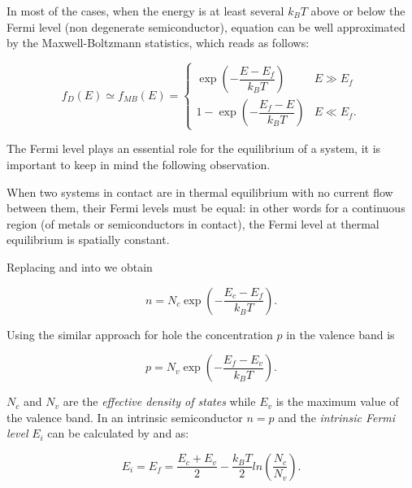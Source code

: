 In most of the cases, when the energy is at least several $k_BT$ above or below the Fermi level (non degenerate semiconductor), equation  can be well approximated by the Maxwell-Boltzmann statistics, which reads as follows:

\begin{equation}
\label{eq: maxwell distribution}
f_D(E)\simeq f_{MB}(E) = 
\begin{cases}
\exp\left(-\dfrac{E-E_f}{k_B T}\right) & E\gg E_f \\
1-\exp\left(-\dfrac{E_f-E}{k_BT}\right) & E \ll E_f .
\end{cases}
\end{equation}

The Fermi level plays an essential role for the equilibrium of a system, it is important to keep in mind the following observation.

\begin{Osservazione}
When two systems in contact are in thermal equilibrium with no current flow between them, their Fermi levels must be equal: in other words for a continuous region (of metals or semiconductors in contact), the Fermi level at thermal equilibrium is spatially constant.
\end{Osservazione}

Replacing  and  into  we obtain

\begin{equation}
n = N_c \exp\left(-\dfrac{E_c-E_f}{k_BT}\right). \label{eq: n density fd}
\end{equation}

Using the similar approach for hole the concentration $p$ in the valence band is

\begin{equation}
p = N_v \exp\left(-\dfrac{E_f-E_v}{k_B T}\right).  \label{eq: p density fd}
\end{equation}

$N_c$ and $N_v$ are the \textit{effective density of states} while $E_v$ is the maximum value of the valence band.
In an intrinsic semiconductor $n=p$ and the \textit{intrinsic Fermi level} $E_i$ can be calculated by  and  as:

\begin{equation}
\label{eq: midgap equilibrium}
E_i=E_f=\dfrac{E_c+E_v}{2} - \dfrac{k_B T}{2}ln\left(\dfrac{N_c}{N_v}\right).
\end{equation}

